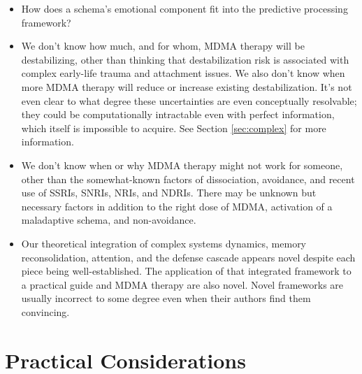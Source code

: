 \documentclass[12pt,letterpaper]{book}
\begin{document}
\begin{itemize}
    In our experience, MDMA therapy seems to produce, in the long-term, changes that both the individual and their emotionally-healthy friends and therapists think are positive developments\footnote{High-control communities and abusers may be unhappy about someone's increase in independence. Likewise, communities who form an identity around their fear, hatred, or subjugation of an out-group may be unhappy about someone's increased compassion for the out-group.}. In this book we use the terms "maladaptive" and "adaptive" casually in this sense.
    \item How does a schema's emotional component fit into the predictive processing framework?
    \item We don't know how much, and for whom, MDMA therapy will be destabilizing, other than thinking that destabilization risk is associated with complex early-life trauma and attachment issues. We also don't know when more MDMA therapy will reduce or increase existing destabilization. It's not even clear to what degree these uncertainties are even conceptually resolvable; they could be computationally intractable even with perfect information, which itself is impossible to acquire. See Section \ref{sec:complex} for more information.
    \item We don't know when or why MDMA therapy might not work for someone, other than the somewhat-known factors of dissociation, avoidance, and recent use of SSRIs, SNRIs, NRIs, and NDRIs. There may be unknown but necessary factors in addition to the right dose of MDMA, activation of a maladaptive schema, and non-avoidance.
    \item Our theoretical integration of complex systems dynamics, memory reconsolidation, attention, and the defense cascade appears novel despite each piece being well-established. The application of that integrated framework to a practical guide and MDMA therapy are also novel. Novel frameworks are usually incorrect to some degree even when their authors find them convincing.
\end{itemize}
\chapter{Practical Considerations}
\end{document}
